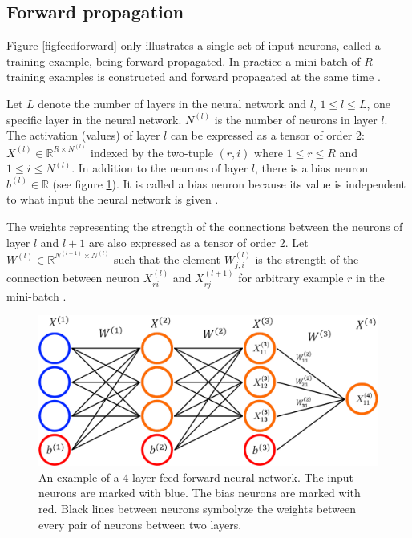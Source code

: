 \documentclass[a4paper, twoside]{article}
\begin{document}
\subsection{Forward propagation}
Figure \ref{figfeedforward} only illustrates a single set of input neurons, called a training example, being forward propagated. In practice a mini-batch of $R$ training examples is constructed and forward propagated at the same time \cite{cs231n} \cite{wikiStanford}.

Let $L$ denote the number of layers in the neural network and $l$, $1 \leq l \leq L$, one specific layer in the neural network. $N^{(l)}$ is the number of neurons in layer $l$. The activation (values) of layer $l$ can be expressed as a tensor of order 2: $X^{(l)} \in \mathbb{R}^{R \times N^{(l)}}$ indexed by the two-tuple $(r,i)$ where $1 \leq r \leq R$ and $1 \leq i \leq N^{(l)}$. In addition to the neurons of layer $l$, there is a bias neuron $b^{(l)} \in \mathbb{R}$ (see figure \ref{figFCCmath}). It is called a bias neuron because its value is independent to what input the neural network is given \cite{cs231n} \cite{wikiStanford}.

The weights representing the strength of the connections between the neurons of layer $l$ and $l+1$ are also expressed as a tensor of order 2. Let $W^{(l)} \in \mathbb{R}^{N^{(l+1)}  \times N^{(l)}}$ such that the element $W_{j, i}^{(l)}$ is the strength of the connection between neuron $X_{ri}^{(l)}$ and $X_{rj}^{(l+1)}$ for arbitrary example $r$ in the mini-batch \cite{cs231n} \cite{wikiStanford}.

\begin{figure}[h]
	\centering
  		\includegraphics[scale=0.4]{FCC.png}
  	\caption{An example of a 4 layer feed-forward neural network. The input neurons are marked with blue. The bias neurons are marked with red. Black lines between neurons symbolyze the weights between every pair of neurons between two layers.} \label{figFCCmath}
\end{figure}
\end{document}
